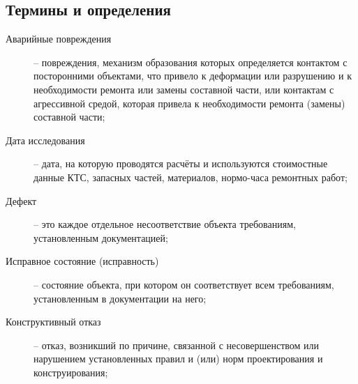 \subsection{Термины и определения}
\begin{description}
    \item
    [Аварийные повреждения] -- повреждения, механизм образования которых определяется контактом с посторонними объектами, что привело к деформации или разрушению и к необходимости ремонта или замены составной части, или контактам с агрессивной средой, которая привела к необходимости ремонта (замены) составной части; %
\item
[Дата исследования]-- дата, на которую проводятся расчёты и используются стоимостные данные КТС, запасных частей, материалов, нормо-часа ремонтных работ;%
\item
[Дефект] -- это каждое отдельное несоответствие объекта требованиям, установленным документацией;
\item
[Исправное состояние (исправность)] -- состояние объекта, при котором он соответствует всем требованиям, установленным в документации на него;
\item
[Конструктивный отказ] -- отказ, возникший по причине, связанной с несовершенством или нарушением установленных правил и (или) норм проектирования и конструирования;

\end{description}
